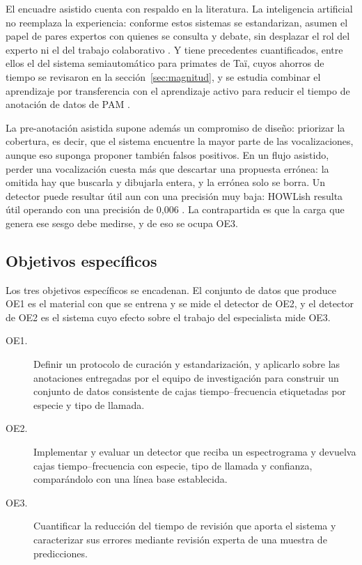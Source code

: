 El encuadre asistido cuenta con respaldo en la literatura. La inteligencia
artificial no reemplaza la experiencia: conforme estos sistemas se estandarizan,
asumen el papel de pares expertos con quienes se consulta y debate, sin desplazar
el rol del experto ni el del trabajo colaborativo
\citep{stowell_computational_2022}. Y tiene precedentes cuantificados, entre ellos
el del sistema semiautomático para primates de Taï, cuyos ahorros de tiempo se
revisaron en la sección~\ref{sec:magnitud}, y se estudia combinar el aprendizaje
por transferencia con el aprendizaje activo para reducir el tiempo de anotación
de datos de PAM \citep{kath_leveraging_2024}.

La pre-anotación asistida supone además un compromiso de diseño: priorizar la
cobertura, es
decir, que el sistema encuentre la mayor parte de las vocalizaciones, aunque eso
suponga proponer también falsos positivos. En un flujo asistido, perder una
vocalización cuesta más que descartar una propuesta errónea: la omitida hay que
buscarla y dibujarla entera, y la errónea solo se borra. Un detector puede
resultar útil aun con una precisión muy baja: HOWLish resulta útil operando con una precisión
de 0,006 \citep{Campos_Krofel_Rio-Maior_Renna_2025}. La contrapartida es que la carga que genera ese sesgo debe medirse, y de eso se ocupa
OE3.

\subsection{Objetivos específicos}

Los tres objetivos específicos se encadenan. El conjunto de datos que produce OE1
es el material con que se entrena y se mide el detector de OE2, y el detector de
OE2 es el sistema cuyo efecto sobre el trabajo del especialista mide OE3.

\begin{description}
    \item[OE1.] Definir un protocolo de curación y estandarización, y aplicarlo
          sobre las anotaciones entregadas por el equipo de investigación para construir
          un conjunto de datos consistente de cajas tiempo--frecuencia etiquetadas por
          especie y tipo de llamada.

    \item[OE2.] Implementar y evaluar un detector que reciba un espectrograma y
          devuelva cajas tiempo--frecuencia con especie, tipo de llamada y confianza,
          comparándolo con una línea base establecida.

    \item[OE3.] Cuantificar la reducción del tiempo de revisión que aporta el
          sistema y caracterizar sus errores mediante revisión experta de una muestra
          de predicciones.
\end{description}

